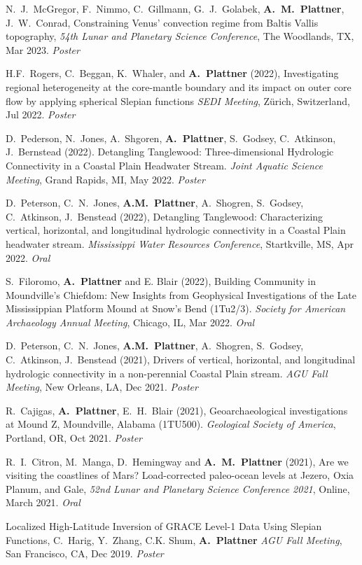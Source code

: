 \documentclass[10pt]{article}
\begin{document}
\spcp N.~J.~McGregor, F.~Nimmo, C.~Gillmann, G.~J.~Golabek, \textbf{A.~M.~Plattner}, J.~W.~Conrad, Constraining Venus' convection regime from Baltis Vallis topography, \emph{54th Lunar and Planetary Science Conference}, The Woodlands, TX, Mar 2023. \emph{Poster}

\spcp H.F.~Rogers, C.~Beggan, K.~Whaler, and \textbf{A.~Plattner}
(2022), Investigating regional heterogeneity at the core-mantle
boundary and its impact on outer core flow by applying spherical
Slepian functions \emph{SEDI Meeting}, Z\"urich, Switzerland, Jul 2022. \emph{Poster}

\spcp D.~Pederson, N.~Jones, A.~Shgoren, \textbf{A.~Plattner},
S.~Godsey, C.~Atkinson, J.~Bernstead (2022). Detangling Tanglewood:
Three-dimensional Hydrologic Connectivity in a Coastal Plain Headwater
Stream. \emph{Joint Aquatic Science Meeting}, Grand Rapids, MI, May
2022. \emph{Poster}

\spcp D.~Peterson, C.~N.~Jones, \textbf{A.M.~Plattner}, A.~Shogren,
S.~Godsey, C.~Atkinson, J.~Benstead (2022), Detangling Tanglewood:
Characterizing vertical, horizontal, and longitudinal hydrologic
connectivity in a Coastal Plain headwater stream. \emph{Mississippi
Water Resources Conference}, Startkville, MS, Apr 2022.  \emph{Oral}

\spcp S.~Filoromo, \textbf{A.~Plattner} and E. Blair (2022), Building
Community in Moundville's Chiefdom: New Insights from Geophysical
Investigations of the Late Mississippian Platform Mound at Snow's Bend
(1Tu2/3). \emph{Society for American Archaeology Annual Meeting}, Chicago,
IL, Mar 2022. \emph{Oral}

\spcp D.~Peterson, C.~N.~Jones, \textbf{A.M.~Plattner}, A.~Shogren,
S.~Godsey, C.~Atkinson, J.~Benstead (2021), Drivers of vertical,
horizontal, and longitudinal hydrologic connectivity in a
non-perennial Coastal Plain stream. \emph{AGU Fall Meeting}, New
Orleans, LA, Dec 2021. \emph{Poster}

\spcp R.~Cajigas, \textbf{A.~Plattner}, E.~H.~Blair (2021),
Geoarchaeological investigations at Mound Z, Moundville, Alabama
(1TU500). \emph{Geological Society of America}, Portland, OR, Oct
2021. \emph{Poster}

\spcp R.~I.~Citron, M.~Manga, D.~Hemingway and \textbf{A.~M.~Plattner}
(2021), Are we visiting the coastlines of Mars? Load-corrected
paleo-ocean levels at Jezero, Oxia Planum, and Gale, \emph{52nd Lunar
and Planetary Science Conference 2021}, Online, March 2021.
\emph{Oral}

\spcp
Localized High-Latitude Inversion of GRACE Level-1 Data Using Slepian Functions,
C.~Harig, Y.~Zhang, C.K. Shum, \textbf{A.~Plattner}
\emph{AGU Fall Meeting}, San Francisco, CA, Dec 2019. \emph{Poster}
\end{document}
